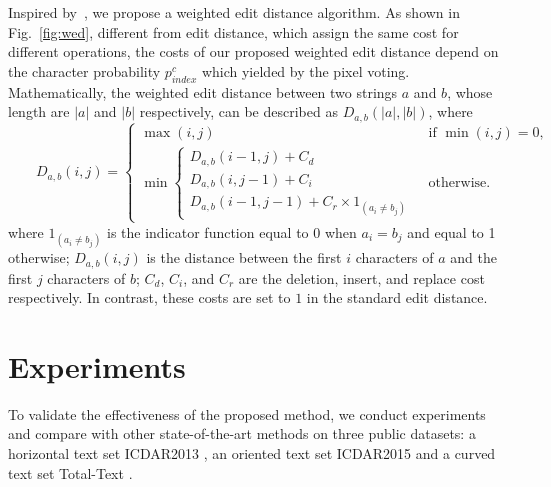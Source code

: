 \documentclass[runningheads]{llncs}
\begin{document}
Inspired by~\cite{yao2014unified}, we propose a weighted edit distance algorithm. As shown in Fig.~\ref{fig:wed}, different from edit distance,  which assign the same cost for different operations, the costs of our proposed weighted edit distance depend on the character probability $p_{index}^c$ which yielded by the pixel voting. Mathematically, the weighted edit distance between two strings $a$ and $b$, whose length are $|a|$ and $|b|$ respectively, can be described as $D_{a,b}(|a|,|b|)$, where
\begin{equation}{\qquad D_{a,b}(i,j)={\begin{cases}\max(i,j)&{\text{ if }}\min(i,j)=0,\\\min {\begin{cases} D_{a,b}(i-1,j)+C_d\\ D_{a,b}(i,j-1)+C_i\\ D_{a,b}(i-1,j-1)+C_r \times 1_{(a_{i}\neq b_{j})}\end{cases}}&{\text{ otherwise.}}\end{cases}}}
\end{equation}
where $1_{(a_{i}\neq b_{j})}$ is the indicator function equal to 0 when $a_{i}=b_{j}$ and equal to 1 otherwise; $D_{a,b}(i,j)$ is the distance between the first $i$ characters of $a$ and the first $j$ characters of $b$; $C_d$, $C_i$, and $C_r$ are the deletion, insert, and replace cost respectively. In contrast, these costs are set to $1$ in the standard edit distance.


\section{Experiments}

To validate the effectiveness of the proposed method, we conduct experiments and compare with other state-of-the-art methods on three public datasets: a horizontal text set ICDAR2013 \cite{karatzas2013icdar}, an oriented text set ICDAR2015 \cite{karatzas2015icdar} and a curved text set Total-Text \cite{CK2017}.
\end{document}
